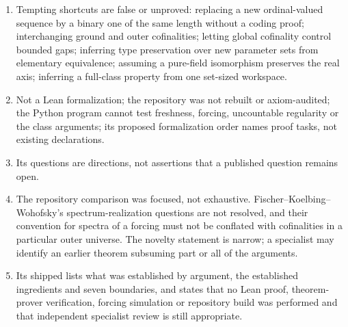 \documentclass[11pt,letterpaper]{article}
\numberwithin{equation}{section}
\theoremstyle{definition}
\theoremstyle{remark}
\begin{document}
\begin{enumerate}[label=03.\arabic*,leftmargin=3.2em]
convergence of an ordinary sequence to a missing point is asserted.
\item Tempting shortcuts are false or unproved: replacing a new ordinal-valued
sequence by a binary one of the same length without a coding proof;
interchanging ground and outer cofinalities; letting global cofinality control
bounded gaps; inferring type preservation over new parameter sets from
elementary equivalence; assuming a pure-field isomorphism preserves the real
axis; inferring a full-class property from one set-sized workspace.
\item Not a Lean formalization; the repository was not rebuilt or
axiom-audited; the Python program cannot test freshness, forcing, uncountable
regularity or the class arguments; its proposed formalization order names
proof tasks, not existing declarations.
\item Its questions are directions, not assertions that a published question
remains open.
\item The repository comparison was focused, not exhaustive. Fischer--Koelbing--Wohofsky's
spectrum-realization questions are not resolved, and their convention for
spectra of a forcing must not be conflated with cofinalities in a particular
outer universe. The novelty statement is narrow; a specialist may identify an
earlier theorem subsuming part or all of the arguments.
\item Its shipped  lists what was
established by argument, the established ingredients and seven boundaries, and
states that no Lean proof, theorem-prover verification, forcing simulation or
repository build was performed and that independent specialist review is still
appropriate.
\end{enumerate}
\end{document}

